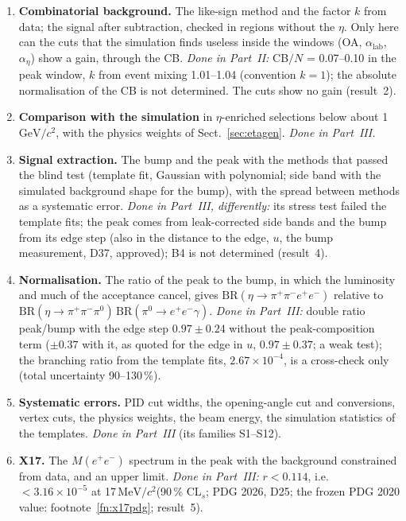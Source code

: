 \documentclass[11pt,a4paper]{article}
\newcommand{\piz}{\ensuremath{\pi^{0}}\xspace}
\newcommand{\ee}{\ensuremath{e^{+}e^{-}}\xspace}
\newcommand{\pipi}{\ensuremath{\pi^{+}\pi^{-}}\xspace}
\newcommand{\ppee}{\ensuremath{\pi^{+}\pi^{-}e^{+}e^{-}}\xspace}
\newcommand{\Mee}{\ensuremath{M(e^{+}e^{-})}\xspace}
\newcommand{\GeVcc}{\ensuremath{\mathrm{GeV}/c^{2}}\xspace}
\newcommand{\MeVcc}{\ensuremath{\mathrm{MeV}/c^{2}}\xspace}
\begin{document}
\begin{enumerate}
\item \textbf{Combinatorial background.} The like-sign method and the factor $k$ from data; the
      signal after subtraction, checked in regions without the $\eta$. Only here can the cuts that
      the simulation finds useless inside the windows (OA, $\alpha_{\mathrm{lab}}$, $\alpha_\eta$)
      show a gain, through the CB.
      \emph{Done in Part~II:} CB$/N$ = 0.07--0.10 in the peak window, $k$ from event mixing 1.01--1.04 (convention
      $k=1$); the absolute normalisation of the CB is not determined. The cuts show no gain (result~2).
\item \textbf{Comparison with the simulation} in $\eta$-enriched selections below about
      1\,\GeVcc, with the physics weights of Sect.~\ref{sec:etagen}. \emph{Done in Part~III.}
\item \textbf{Signal extraction.} The bump and the peak with the methods that passed the blind
      test (template fit, Gaussian with polynomial; side band with the simulated background shape
      for the bump), with the spread between methods as a systematic error.
      \emph{Done in Part~III, differently:} its stress test failed the template fits; the peak comes from leak-corrected
      side bands and the bump from its edge step (also in the distance to the edge, $u$, the bump measurement,
      D37, approved); B4 is not determined (result~4).
\item \textbf{Normalisation.} The ratio of the peak to the bump, in which the luminosity and much
      of the acceptance cancel, gives $\mathrm{BR}(\eta\to\ppee)$ relative to
      $\mathrm{BR}(\eta\to\pipi\piz)\,\mathrm{BR}(\piz\to\ee\gamma)$.
      \emph{Done in Part~III:} double ratio peak/bump with the edge step $0.97\pm0.24$ without the peak-composition term
      ($\pm0.37$ with it, as quoted for the edge in $u$, $0.97\pm0.37$; a weak test); the branching ratio
      from the template fits, $2.67\times10^{-4}$, is a cross-check only (total uncertainty 90--130\,\%).
\item \textbf{Systematic errors.} PID cut widths, the opening-angle cut and conversions, vertex
      cuts, the physics weights, the beam energy, the simulation statistics of the templates.
      \emph{Done in Part~III} (its families S1--S12).
\item \textbf{X17.} The \Mee spectrum in the peak with the background constrained from data, and
      an upper limit. \emph{Done in Part~III:} $r<0.114$, i.e.\ $<3.16\times10^{-5}$ at 17\,\MeVcc (90\,\% CL$_s$; PDG 2026,
      D25; the frozen PDG 2020 value: footnote~\ref{fn:x17pdg}; result~5).
\end{enumerate}
\end{document}
